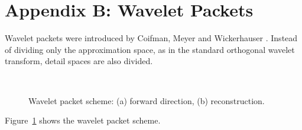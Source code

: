 \chapter*{Appendix B: Wavelet Packets}

Wavelet packets were introduced by Coifman, Meyer and Wickerhauser
\cite{wave:coifman92}. Instead of dividing only the approximation space, 
as in the standard orthogonal wavelet transform, 
detail spaces are also divided.

\begin{figure}[htb]
\centerline{
\hbox{
}
}
\caption{Wavelet packet scheme: (a) forward direction, (b) reconstruction.}
\label{fig_packet}
\end{figure}

Figure~\ref{fig_packet} shows the wavelet packet scheme.
